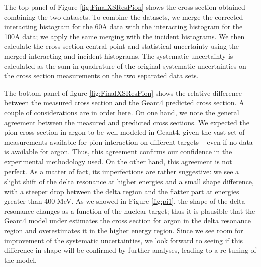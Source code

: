 The top panel of Figure \ref{fig:FinalXSResPion} shows the cross section obtained combining the two datasets. To combine the datasets, we merge the corrected interacting histogram for the 60A data with the interacting histogram for the 100A data; we apply the same merging with the incident histograms. We then calculate the cross section central point and statistical uncertainty using the merged interacting and incident histograms. The systematic uncertainty is calculated as the sum in quadrature of the original systematic uncertainties on the cross section measurements on the two separated data sets.

The bottom panel of figure  \ref{fig:FinalXSResPion} shows the relative difference between the measured cross section and the Geant4 predicted cross section.
A couple of considerations are in order here. On one hand, we note the general agreement between the measured and predicted cross sections. We expected the pion cross section in argon to be well modeled in Geant4, given the vast set of measurements available for pion interaction on different targets -- even if no data is available for argon. Thus, this agreement confirms our confidence in the experimental methodology used.
On the other hand, this agreement is not perfect.  As a matter of fact, its imperfections are rather suggestive: we see a slight shift of the delta resonance at higher energies and a small shape difference, with a steeper drop between the delta region and the flatter part at energies greater than 400 MeV. As we showed in Figure \ref{fig:pi1}, the shape of the delta resonance changes as a function of the nuclear target; thus it is plausible that the Geant4 model under estimates the cross section for argon in the delta resonance region and overestimates it in the higher energy region. Since we see room for improvement of the systematic uncertainties, we look forward to seeing if this difference in shape will be confirmed by further analyses, leading to a re-tuning of the model.

